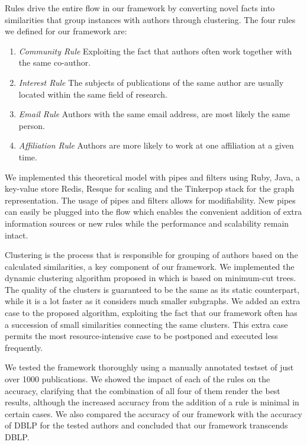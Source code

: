 Rules drive the entire flow in our framework by converting novel facts into similarities that group instances with authors through clustering. The four rules we defined for our framework are:

\begin{enumerate}
	\item \textit{Community Rule} Exploiting the fact that authors often work together with the same co-author.
	\item \textit{Interest Rule} The subjects of publications of the same author are usually located within the same field of research.
	\item \textit{Email Rule} Authors with the same email address, are most likely the same person.
	\item \textit{Affiliation Rule} Authors are more likely to work at one affiliation at a given time.
\end{enumerate}

We implemented this theoretical model with pipes and filters using Ruby, Java, a key-value store Redis, Resque for scaling and the Tinkerpop stack for the graph representation. The usage of pipes and filters allows for modifiability. New pipes can easily be plugged into the flow which enables the convenient addition of extra information sources or new rules while the performance and scalability remain intact.

Clustering is the process that is responsible for grouping of authors based on the calculated similarities, a key component of our framework. We implemented the dynamic clustering algorithm proposed in \cite{saha2006dynamic} which is based on minimum-cut trees. The quality of the clusters is guaranteed to be the same as its static counterpart, while it is a lot faster as it considers much smaller subgraphs. We added an extra case to the proposed algorithm, exploiting the fact that our framework often has a succession of small similarities connecting the same clusters. This extra case permits the most resource-intensive case to be postponed and executed less frequently.



We tested the framework thoroughly using a manually annotated testset of just over 1000 publications. We showed the impact of each of the rules on the accuracy, clarifying that the combination of all four of them render the best results, although the increased accuracy from the addition of a rule is minimal in certain cases. We also compared the accuracy of our framework with the accuracy of DBLP for the tested authors and concluded that our framework transcends DBLP.

